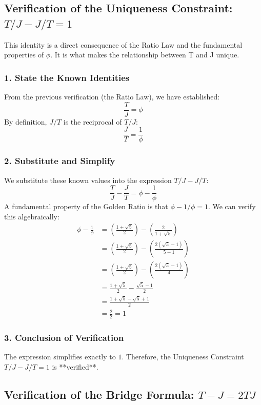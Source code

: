 \newpage
\subsection{Verification of the Uniqueness Constraint: \texorpdfstring{\(T/J - J/T = 1\)}{T/J - J/T = 1}}
This identity is a direct consequence of the Ratio Law and the fundamental properties of $\phi$. It is what makes the relationship between T and J unique.

\subsubsection*{1. State the Known Identities}
From the previous verification (the Ratio Law), we have established:
$$ \frac{T}{J} = \phi $$
By definition, $J/T$ is the reciprocal of $T/J$:
$$ \frac{J}{T} = \frac{1}{\phi} $$

\subsubsection*{2. Substitute and Simplify}
We substitute these known values into the expression $T/J - J/T$:
$$ \frac{T}{J} - \frac{J}{T} = \phi - \frac{1}{\phi} $$
A fundamental property of the Golden Ratio is that $\phi - 1/\phi = 1$. We can verify this algebraically:
\begin{align*}
\phi - \frac{1}{\phi} &= \left(\frac{1+\sqrt{5}}{2}\right) - \left(\frac{2}{1+\sqrt{5}}\right) \\
&= \left(\frac{1+\sqrt{5}}{2}\right) - \left(\frac{2(\sqrt{5}-1)}{5-1}\right) \\
&= \left(\frac{1+\sqrt{5}}{2}\right) - \left(\frac{2(\sqrt{5}-1)}{4}\right) \\
&= \frac{1+\sqrt{5}}{2} - \frac{\sqrt{5}-1}{2} \\
&= \frac{1+\sqrt{5}-\sqrt{5}+1}{2} \\
&= \frac{2}{2} = 1
\end{align*}

\subsubsection*{3. Conclusion of Verification}
The expression simplifies exactly to $1$. Therefore, the Uniqueness Constraint $T/J - J/T = 1$ is **verified**.

\newpage
\subsection{Verification of the Bridge Formula: \texorpdfstring{\(T - J = 2TJ\)}{T - J = 2TJ}}

